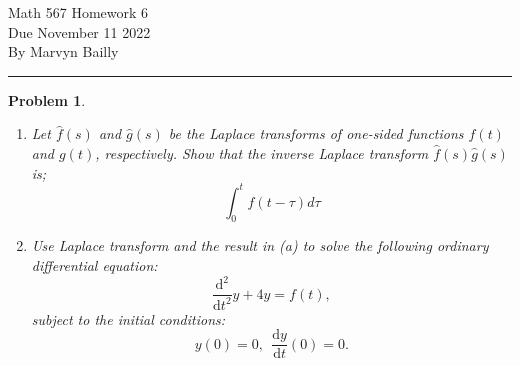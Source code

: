 \documentclass[12pt]{report}
\newtheorem{problem}{Problem}
\newcommand{\dd}[2]{\frac{\mathrm{d} #1}{\mathrm{d} #2}} %
\newcommand{\ddn}[3]{\frac{\mathrm{d}^{#1} #2}{\mathrm{d} #3^{#1}}} %
\begin{document}
\large

\begin{center}
 Math 567 Homework 6\\
 Due November 11 2022\\
 By Marvyn Bailly\\
\end{center}

\normalsize

\hrule



\begin{problem}
    \begin{enumerate}
        \item [{\bf (a)}]
        Let $\hat{f}(s)$ and $\hat{g}(s)$ be the Laplace transforms of one-sided functions $f(t)$ and $g(t)$, respectively. Show that the inverse Laplace transform $\hat{f}(s)\hat{g}(s)$ is;
        \[\int_0^t f(t - \tau)d\tau \]
        
        
        \item [{\bf (b)}]
        Use Laplace transform and the result in (a) to solve the following ordinary differential equation: 
        \[ \ddn{2}{}{t} y + 4y = f(t),\]
        subject to the initial conditions:
        \[y(0)=0, ~~ \dd{y}{t}(0) =0. \]
    
    \end{enumerate}
\end{problem}
\end{document}
